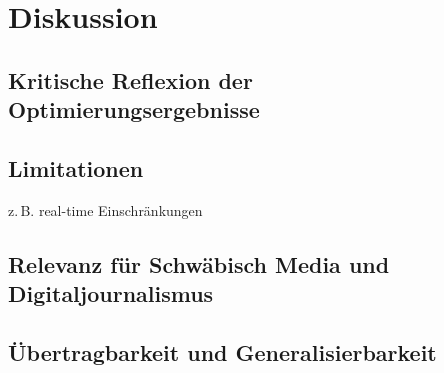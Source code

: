 \section{Diskussion}
\subsection{Kritische Reflexion der Optimierungsergebnisse}
\subsection{Limitationen}
z.\,B. real-time Einschränkungen
\subsection{Relevanz für Schwäbisch Media und Digitaljournalismus}
\subsection{Übertragbarkeit und Generalisierbarkeit}